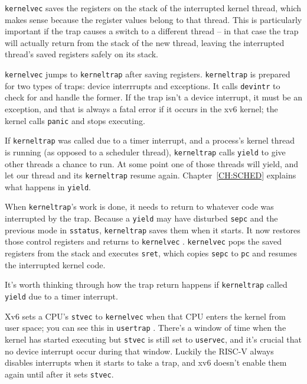 {\tt kernelvec} saves the registers on the stack of the interrupted
kernel thread, which makes sense because the register values belong to
that thread. This is particularly important if the trap causes a
switch to a different thread -- in that case the trap will actually
return from the stack of the new thread, leaving the interrupted
thread's saved registers safely on its stack.

{\tt kernelvec} jumps to {\tt kerneltrap}
 after saving registers.
{\tt kerneltrap} is prepared for two types of traps:
device interrrupts and exceptions. It calls
{\tt devintr}
to check for and handle the former.
If the trap isn't a device interrupt, it must be an exception,
and that is always a fatal error if it occurs in the xv6 kernel;
the kernel calls \lstinline{panic} and stops executing.

If {\tt kerneltrap} was called due to a timer interrupt, and a
process's kernel thread is running (as opposed to a scheduler thread),
{\tt kerneltrap} calls {\tt yield} to give other threads a chance to
run. At some point one of those threads will yield, and let our thread
and its {\tt kerneltrap} resume again.
Chapter~\ref{CH:SCHED} explains what happens in {\tt yield}.

When {\tt kerneltrap}'s work is done, it needs to return to whatever
code was interrupted by the trap. Because a {\tt yield} may have
disturbed {\tt sepc} and the previous mode in {\tt sstatus},
{\tt kerneltrap} saves them when it starts. It now restores those
control registers and returns to {\tt kernelvec}
.
{\tt kernelvec} pops the saved registers from the stack and
executes {\tt sret}, which copies {\tt sepc} to {\tt pc}
and resumes the interrupted kernel code.

It's worth thinking through how the trap return happens if
{\tt kerneltrap} called {\tt yield} due to a timer interrupt.

Xv6 sets a CPU's {\tt stvec} to {\tt kernelvec} when that CPU
enters the kernel from user space; you can see this in {\tt usertrap}
.
There's a window of time when the kernel has started executing
but {\tt stvec} is still set to {\tt uservec}, and it's crucial that 
no device interrupt occur during that window.
Luckily the RISC-V always disables interrupts when it starts
to take a trap, and xv6 doesn't enable them again until
after it sets {\tt stvec}.

